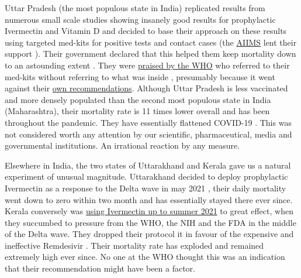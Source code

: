 \documentclass[11pt,a4paper]{article}
\begin{document}
Uttar Pradesh (the most populous state in India) replicated results from numerous small scale studies showing insanely good results for prophylactic Ivermectin and Vitamin D and decided to base their approach on these results using targeted med-kits for positive tests and contact cases (the \href{https://www.aiims.edu/en.html}{AIIMS} lent their support \cite{Behera2021-qu}). Their government declared that this helped them keep mortality down to an astounding extent \cite{indianexpress12052021}. They were \href{https://www.who.int/india/news/feature-stories/detail/uttar-pradesh-going-the-last-mile-to-stop-covid-19}{praised by the WHO} who referred to their med-kits without referring to what was inside \cite{medicalupdateonline21052021} \cite{hindu14092020}, presumably because it went against their \href{https://www.who.int/news-room/feature-stories/detail/who-advises-that-ivermectin-only-be-used-to-treat-covid-19-within-clinical-trials}{own recommendations}. Although Uttar Pradesh is less vaccinated and more densely populated than the second most populous state in India (Maharashtra), their mortality rate is 11 times lower overall and has been throughout the pandemic. They have essentially flattened COVID-19 \cite{hindustantimes19092021}. This was not considered worth any attention by our scientific, pharmaceutical, media and governmental institutions. An irrational reaction by any measure.

Elsewhere in India, the two states of Uttarakhand and Kerala gave us a natural experiment of unusual magnitude. Uttarakhand decided to deploy prophylactic Ivermectin as a response to the Delta wave in may 2021 \cite{economictimes12052021}, their daily mortality went down to zero within two month and has essentially stayed there ever since. Kerala conversely was \href{https://dhs.kerala.gov.in/wp-content/uploads/2021/04/Kerala-State-COVID-19-guidelines-Version-3.pdf}{using Ivermectin up to summer 2021} to great effect, when they succumbed to pressure from the WHO, the NIH and the FDA in the middle of the Delta wave. They dropped their protocol it in favour of the expensive and ineffective Remdesivir \cite{hindu06082021}. Their mortality rate has exploded and remained extremely high ever since. No one at the WHO thought this was an indication that their recommendation might have been a factor.   
\end{document}
